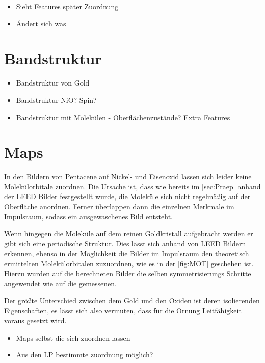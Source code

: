         \begin{itemize}
            \item Sieht Features später Zuordnung
            \item Ändert sich was
        \end{itemize}

    \section{Bandstruktur}
        \begin{itemize}
            \item Bandstruktur von Gold
            \item Bandstruktur NiO? Spin?
            \item Bandstruktur mit Molekülen - Oberflächenzustände? Extra Features
        \end{itemize}

    \section{Maps}
        In den Bildern von Pentacene auf Nickel- und Eisenoxid lassen sich leider keine Molekülorbitale zuordnen.
        Die Ursache ist, dass wie bereits im \autoref{sec:Praep} anhand der LEED Bilder festgestellt wurde, die Moleküle sich nicht regelmäßig auf der Oberfläche anordnen.
        Ferner überlappen dann die einzelnen Merkmale im Impulsraum, sodass ein ausgewaschenes Bild entsteht.

        Wenn hingegen die Moleküle auf dem reinen Goldkristall aufgebracht werden er gibt sich eine periodische Struktur.
        Dies lässt sich anhand von LEED Bildern erkennen, ebenso in der Möglichkeit die Bilder im Impulsraum den theoretisch ermittelten Molekülorbitalen zuzuordnen, wie es in der \autoref{fig:MOT} geschehen ist.
        Hierzu wurden auf die berechneten Bilder die selben symmetrisierungs Schritte angewendet wie auf die gemessenen.

        Der größte Unterschied zwischen dem Gold und den Oxiden ist deren isolierenden Eigenschaften, es lässt sich also vermuten, dass für die Ornung Leitfähigkeit voraus gesetzt wird.


        \begin{itemize}
            \item Maps selbst die sich zuordnen lassen
            \item Aus den LP bestimmte zuordnung möglich?
        \end{itemize}

